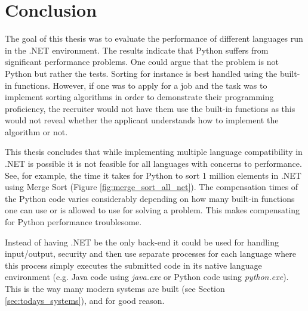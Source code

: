 \section{Conclusion}
The goal of this thesis was to evaluate the performance of different languages run in the .NET environment. The results indicate that Python suffers from significant performance problems. One could argue that the problem is not Python but rather the tests. Sorting for instance is best handled using the built-in functions. However, if one was to apply for a job and the task was to implement sorting algorithms in order to demonstrate their programming proficiency, the recruiter would not have them use the built-in functions as this would not reveal whether the applicant understands how to implement the algorithm or not.

This thesis concludes that while implementing multiple language compatibility in .NET is possible it is not feasible for all languages with concerns to performance. See, for example, the time it takes for Python to sort 1 million elements in .NET using Merge Sort (Figure \ref{fig:merge_sort_all_net}). The compensation times of the Python code varies considerably depending on how many built-in functions one can use or is allowed to use for solving a problem. This makes compensating for Python performance troublesome.

Instead of having .NET be the only back-end it could be used for handling input/output, security and then use separate processes for each language where this process simply executes the submitted code in its native language environment (e.g. Java code using \textit{java.exe} or Python code using \textit{python.exe}). This is the way many modern systems are built (see Section \ref{sec:todays_systems}), and for good reason.